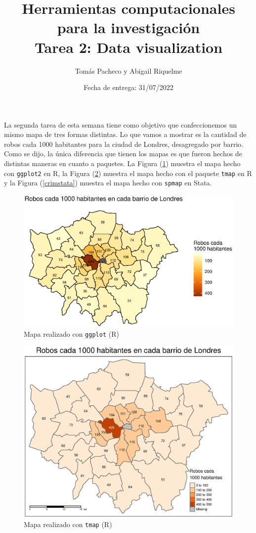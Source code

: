 \documentclass[12pt]{article}
\title{ %
Herramientas computacionales para la investigaci\'on \\
\vspace{0.3cm}
\textbf{Tarea 2: Data visualization}}
\author{Tom\'as Pacheco y Abigail Riquelme}
\date{Fecha de entrega: 31/07/2022}
\begin{document}
\maketitle
\onehalfspace


La segunda tarea de esta semana tiene como objetivo que confeccionemos un mismo mapa de tres formas distintas. 
Lo que vamos a mostrar es la cantidad de robos cada 1000 habitantes para la ciudad de Londres, desagregado por barrio. Como se dijo, la \'unica diferencia que tienen los mapas es que fueron hechos de distintas maneras en cuanto a paquetes. La Figura (\ref{crimggplot}) muestra el mapa hecho con \texttt{ggplot2} en R, la Figura (\ref{crimtmap}) muestra el mapa hecho con el paquete \texttt{tmap} en R y la Figura (\ref{crimstata}) muestra el mapa hecho con \texttt{spmap} en Stata.

\begin{figure}[H]
    \centering
    \includegraphics[width = \textwidth]{graficos/mapa_ggplot.eps}
    \caption{Mapa realizado con \texttt{ggplot} (R)}
    \label{crimggplot}
\end{figure}

\begin{figure}[H]
    \centering
    \includegraphics[width = \textwidth] {graficos/mapa_tmap.eps}
    \caption{Mapa realizado con \texttt{tmap} (R)}
    \label{crimtmap}
\end{figure}
\end{document}
